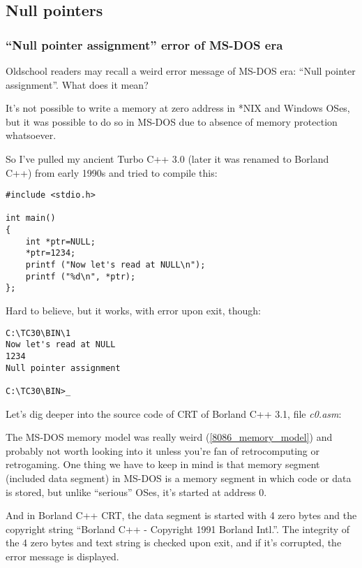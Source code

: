 \subsection{Null pointers}

\subsubsection{``Null pointer assignment'' error of MS-DOS era}

Oldschool readers may recall a weird error message of MS-DOS era: ``Null pointer assignment''.
What does it mean?

It's not possible to write a memory at zero address in *NIX and Windows OSes, but it was possible to do so in MS-DOS due to absence of memory protection whatsoever.

So I've pulled my ancient Turbo C++ 3.0 (later it was renamed to Borland C++) from early 1990s and tried to compile this:

\begin{lstlisting}[style=customc]
#include <stdio.h>

int main()
{
	int *ptr=NULL;
	*ptr=1234;
	printf ("Now let's read at NULL\n");
	printf ("%d\n", *ptr);
};
\end{lstlisting}

Hard to believe, but it works, with error upon exit, though:

\begin{lstlisting}[caption=Ancient Turbo C 3.0]
C:\TC30\BIN\1
Now let's read at NULL
1234
Null pointer assignment

C:\TC30\BIN>_
\end{lstlisting}

Let's dig deeper into the source code of \ac{CRT} of Borland C++ 3.1, file \emph{c0.asm}:



The MS-DOS memory model was really weird (\ref{8086_memory_model}) and probably not worth looking into it unless you're fan of retrocomputing or retrogaming.
One thing we have to keep in mind is that memory segment (included data segment) in MS-DOS is a memory segment in which code or data is stored,
but unlike ``serious'' \ac{OS}es, it's started at address 0.

And in Borland C++ \ac{CRT}, the data segment is started with 4 zero bytes and the copyright string ``Borland C++ - Copyright 1991 Borland Intl.''.
The integrity of the 4 zero bytes and text string is checked upon exit, and if it's corrupted, the error message is displayed.

